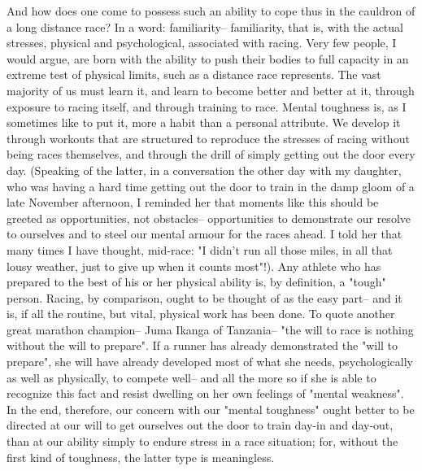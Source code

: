 And how does one come to possess such an ability to cope thus in the cauldron of a long distance race? In a word: familiarity-- familiarity, that is, with the actual stresses, physical and psychological, associated with racing. Very few people, I would argue, are born with the ability to push their bodies to full capacity in an extreme test of physical limits, such as a distance race represents. The vast majority of us must learn it, and learn to become better and better at it, through exposure to racing itself, and through training to race. Mental toughness is, as I sometimes like to put it, more a habit than a personal attribute. We develop it through workouts that are structured to reproduce the stresses of racing without being races themselves, and through the drill of simply getting out the door every day. (Speaking of the latter, in a conversation the other day with my daughter, who was having a hard time getting out the door to train in the damp gloom of a late November afternoon, I reminded her that moments like this should be greeted as opportunities, not obstacles-- opportunities to demonstrate our resolve to ourselves and to steel our mental armour for the races ahead. I told her that many times I have thought, mid-race: "I didn't run all those miles, in all that lousy weather, just to give up when it counts most"!). Any athlete who has prepared to the best of his or her physical ability is, by definition, a "tough" person. Racing, by comparison, ought to be thought of as the easy part-- and it is, if all the routine, but vital, physical work has been done. To quote another great marathon champion-- Juma Ikanga of Tanzania-- "the will to race is nothing without the will to prepare". If a runner has already demonstrated the "will to prepare", she will have already developed most of what she needs, psychologically as well as physically, to compete well-- and all the more so if she is able to recognize this fact and resist dwelling on her own feelings of "mental weakness". In the end, therefore, our concern with our "mental toughness" ought better to be directed at our will to get ourselves out the door to train day-in and day-out, than at our ability simply to endure stress in a race situation; for, without the first kind of toughness, the latter type is meaningless.




